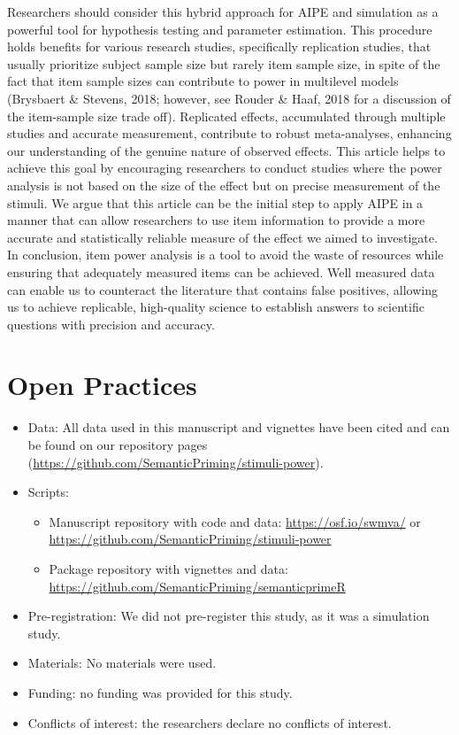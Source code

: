 \documentclass[
  man]{apa7}
\providecommand{\tightlist}{%
  \setlength{\itemsep}{0pt}\setlength{\parskip}{0pt}}
\begin{document}
Researchers should consider this hybrid approach for AIPE and simulation as a powerful tool for hypothesis testing and parameter estimation. This procedure holds benefits for various research studies, specifically replication studies, that usually prioritize subject sample size but rarely item sample size, in spite of the fact that item sample sizes can contribute to power in multilevel models (Brysbaert \& Stevens, 2018; however, see Rouder \& Haaf, 2018 for a discussion of the item-sample size trade off). Replicated effects, accumulated through multiple studies and accurate measurement, contribute to robust meta-analyses, enhancing our understanding of the genuine nature of observed effects. This article helps to achieve this goal by encouraging researchers to conduct studies where the power analysis is not based on the size of the effect but on precise measurement of the stimuli. We argue that this article can be the initial step to apply AIPE in a manner that can allow researchers to use item information to provide a more accurate and statistically reliable measure of the effect we aimed to investigate. In conclusion, item power analysis is a tool to avoid the waste of resources while ensuring that adequately measured items can be achieved. Well measured data can enable us to counteract the literature that contains false positives, allowing us to achieve replicable, high-quality science to establish answers to scientific questions with precision and accuracy.

\section{Open Practices}\label{open-practices}

\begin{itemize}
\tightlist
\item
  Data: All data used in this manuscript and vignettes have been cited and can be found on our repository pages (\url{https://github.com/SemanticPriming/stimuli-power}).
\item
  Scripts:

  \begin{itemize}
  \tightlist
  \item
    Manuscript repository with code and data: \url{https://osf.io/swmva/} or \url{https://github.com/SemanticPriming/stimuli-power}
  \item
    Package repository with vignettes and data: \url{https://github.com/SemanticPriming/semanticprimeR}
  \end{itemize}
\item
  Pre-registration: We did not pre-register this study, as it was a simulation study.
\item
  Materials: No materials were used.
\item
  Funding: no funding was provided for this study.
\item
  Conflicts of interest: the researchers declare no conflicts of interest.
\end{itemize}
\end{document}
